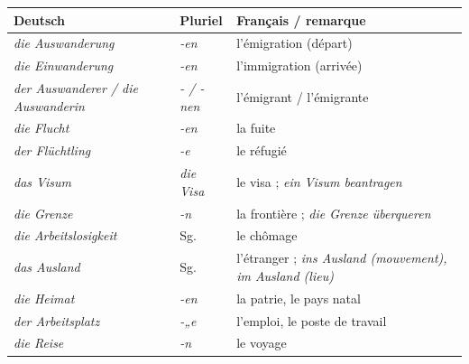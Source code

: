 \documentclass[11pt]{article}
\newcommand{\all}[1]{\ifmmode\text{\textit{#1}}\else\begingroup\selectlanguage{ngerman}\itshape #1\endgroup\fi}
\begin{document}
\begin{center}
\begin{tabularx}{\linewidth}{|l|l|X|}
\hline
\rowcolor{popblueL} \textbf{Deutsch} & \textbf{Pluriel} & \textbf{Français / remarque} \\
\hline
\all{die Auswanderung} & \all{-en} & l'émigration (départ) \\
\hline
\all{die Einwanderung} & \all{-en} & l'immigration (arrivée) \\
\hline
\all{der Auswanderer / die Auswanderin} & \all{- / -nen} & l'émigrant / l'émigrante \\
\hline
\all{die Flucht} & \all{-en} & la fuite \\
\hline
\all{der Flüchtling} & \all{-e} & le réfugié \\
\hline
\all{das Visum} & \all{die Visa} & le visa ; \all{ein Visum beantragen} \\
\hline
\all{die Grenze} & \all{-n} & la frontière ; \all{die Grenze überqueren} \\
\hline
\all{die Arbeitslosigkeit} & Sg. & le chômage \\
\hline
\all{das Ausland} & Sg. & l'étranger ; \all{ins Ausland} (mouvement), \all{im Ausland} (lieu) \\
\hline
\all{die Heimat} & \all{-en} & la patrie, le pays natal \\
\hline
\all{der Arbeitsplatz} & \all{-„e} & l'emploi, le poste de travail \\
\hline
\all{die Reise} & \all{-n} & le voyage \\
\hline
\end{tabularx}
\end{center}
\end{document}
